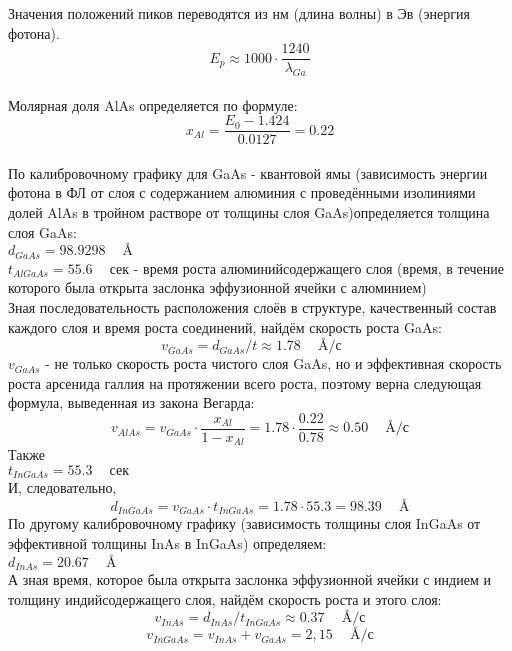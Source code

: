 \documentclass[../FinalReport.tex]{subfiles}
\begin{document}
Значения положений пиков переводятся из нм (длина волны) в Эв (энергия фотона). $$E_p\approx1000\cdot \frac{1240}{\lambda_{Ga}}$$\\
Молярная доля AlAs определяется по формуле: $$x_{Al}=\frac{E_0-1.424}{0.0127}=0.22$$\\
По калибровочному графику для GaAs - квантовой ямы (зависимость энергии фотона в ФЛ от слоя с содержанием алюминия с проведёнными изолиниями долей AlAs в тройном растворе от толщины слоя GaAs)определяется толщина слоя GaAs:\\ $d_{GaAs}=98.9298\phantom{-}\mbox{\AA}$\\
$t_{AlGaAs}=55.6\phantom{-}\mbox{сек}$ - время роста алюминийсодержащего слоя (время, в течение которого была открыта заслонка эффузионной ячейки с алюминием)\\
Зная последовательность расположения слоёв в структуре, качественный состав каждого слоя и время роста соединений, найдём скорость роста GaAs:\\
$$v_{GaAs}=d_{GaAs}/t\approx1.78\phantom{-}\mbox{\AA/с} \phantom{-}$$
$v_{GaAs}$ - не только скорость роста чистого слоя GaAs, но и эффективная скорость роста арсенида галлия на протяжении всего роста, поэтому верна следующая формула, выведенная из закона Вегарда:
$$v_{AlAs}=v_{GaAs}\cdot\frac{x_{Al}}{1-x_{Al}}=1.78\cdot\frac{0.22}{0.78}\approx0.50\phantom{-}\mbox{\AA/с}$$
Также\\
$t_{InGaAs}=55.3\phantom{-}\mbox{сек}$\\
И, следовательно,
$$d_{InGaAs}=v_{GaAs}\cdot t_{InGaAs}=1.78\cdot55.3=98.39\phantom{-}\mbox{\AA}$$
По другому калибровочному графику (зависимость толщины слоя InGaAs от эффективной толщины InAs в InGaAs) определяем:\\
$d_{InAs}=20.67\phantom{-}\mbox{\AA}$\\
А зная время, которое была открыта заслонка эффузионной ячейки с индием и толщину индийсодержащего слоя, найдём скорость роста и этого слоя:
$$v_{InAs}=d_{InAs}/t_{InGaAs}\approx0.37\phantom{-}\mbox{\AA/с}$$
$$v_{InGaAs}=v_{InAs}+v_{GaAs}=2,15\phantom{-}\mbox{\AA/с}$$
$$$$
\end{document}
